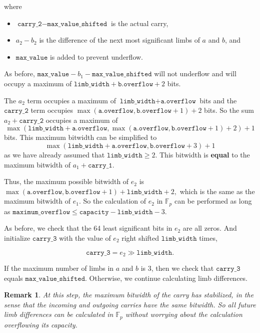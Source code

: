 \documentclass[a4paper, 12pt]{article}
\newtheorem*{remark}{Remark}
\begin{document}
\begin{itemize}
    where

    \begin{itemize}
      \item  $\texttt{carry\_2} - \texttt{max\_value\_shifted}$ is the actual carry,
      \item  $a_2 - b_2$ is the difference of the next most significant limbs of $a$ and $b$, and
      \item $\texttt{max\_value}$ is added to prevent underflow.
    \end{itemize}

    As before, $\texttt{max\_value} - b_1 - \texttt{max\_value\_shifted}$ will not underflow and will occupy a maximum of $\texttt{limb\_width} + \texttt{b.overflow} + 2$ bits.

    The $a_2$ term occupies a maximum of $\texttt{limb\_width} + \texttt{a.overflow}$ bits and the $\texttt{carry\_2}$ term occupies $\max(\texttt{a.overflow}, \texttt{b.overflow} + 1) + 2$ bits. So the sum $a_2 + \texttt{carry\_2}$ occupies a maximum of 
    $$\max(\texttt{limb\_width} + \texttt{a.overflow}, \max(\texttt{a.overflow}, \texttt{b.overflow} + 1) + 2) + 1$$
    bits. This maximum bitwidth can be simplified to 
    $$\max(\texttt{limb\_width} + \texttt{a.overflow}, \texttt{b.overflow} + 3) + 1$$
    as we have already assumed that $\texttt{limb\_width} \ge 2$. This bitwidth is \textbf{equal} to the maximum bitwidth of $a_1 + \texttt{carry\_1}$.

    Thus, the maximum possible bitwidth of $e_2$ is $\max(\texttt{a.overflow}, \texttt{b.overflow} + 1) + \texttt{limb\_width} + 2,$ which is the same as the maximum bitwidth of $e_1$. So the calculation of $e_2$ in $\mathbb{F}_p$ can be performed as long as $\texttt{maximum\_overflow} \le \texttt{capacity} - \texttt{limb\_width} - 3$.

    As before, we check that the 64 least significant bits in $e_2$ are all zeros. And initialize $\texttt{carry\_3}$ with the value of $e_2$ right shifted $\texttt{limb\_width}$ times,

    $$\texttt{carry\_3} = e_2 \gg \texttt{limb\_width}.$$

    If the maximum number of limbs in $a$ and $b$ is 3, then we check that $\texttt{carry\_3}$ equals $\texttt{max\_value\_shifted}$. Otherwise, we continue calculating limb differences.

    \begin{remark}
    At this step, the maximum bitwidth of the carry has stabilized, in the sense that the incoming and outgoing carries have the same bitwidth. So all future limb differences can be calculated in $\mathbb{F}_p$ without worrying about the calculation overflowing its capacity.
    \end{remark}

\end{itemize}
\end{document}
